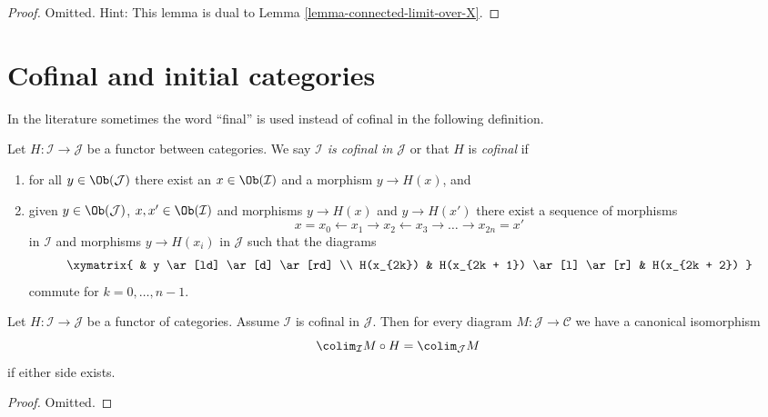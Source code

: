 \begin{proof}
Omitted. Hint: This lemma is dual to Lemma \ref{lemma-connected-limit-over-X}.
\end{proof}




\section{Cofinal and initial categories}
\label{section-cofinal}

\noindent
In the literature sometimes the word ``final'' is used instead of cofinal
in the following definition.

\begin{definition}
\label{definition-cofinal}
Let $H : \mathcal{I} \to \mathcal{J}$ be a functor between categories.
We say {\it $\mathcal{I}$ is cofinal in $\mathcal{J}$} or that
$H$ is {\it cofinal} if
\begin{enumerate}
\item for all $y \in \Ob(\mathcal{J})$ there exist an
$x \in \Ob(\mathcal{I})$ and a morphism $y \to H(x)$, and
\item given $y \in \Ob(\mathcal{J})$, $x, x' \in \Ob(\mathcal{I})$
and morphisms $y \to H(x)$ and $y \to H(x')$ there exist a sequence
of morphisms
$$
x = x_0 \leftarrow x_1 \rightarrow x_2 \leftarrow x_3 \rightarrow \ldots
\rightarrow x_{2n} = x'
$$
in $\mathcal{I}$ and morphisms $y \to H(x_i)$ in $\mathcal{J}$
such that the diagrams
$$
\xymatrix{
& y \ar[ld] \ar[d] \ar[rd] \\
H(x_{2k}) & H(x_{2k + 1}) \ar[l] \ar[r] & H(x_{2k + 2})
}
$$
commute for $k = 0, \ldots, n - 1$.
\end{enumerate}
\end{definition}

\begin{lemma}
\label{lemma-cofinal}
Let $H : \mathcal{I} \to \mathcal{J}$ be a functor of categories. Assume
$\mathcal{I}$ is cofinal in $\mathcal{J}$. Then for every diagram
$M : \mathcal{J} \to \mathcal{C}$ we have a canonical isomorphism
$$
\colim_\mathcal{I} M \circ H
=
\colim_\mathcal{J} M
$$
if either side exists.
\end{lemma}

\begin{proof}
Omitted.
\end{proof}

